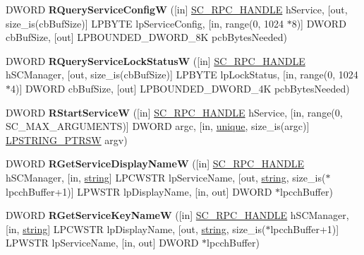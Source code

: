 \begin{DoxyCompactItemize}
\item 
\mbox{\label{interfacesvcctl_ac01214631b67560b652cd09a1f5d3cb5}} 
D\+W\+O\+RD {\bfseries R\+Query\+Service\+ConfigW} (\mbox{[}in\mbox{]} \hyperlink{interfacevoid}{S\+C\+\_\+\+R\+P\+C\+\_\+\+H\+A\+N\+D\+LE} h\+Service, \mbox{[}out, size\+\_\+is(cb\+Buf\+Size)\mbox{]} L\+P\+B\+Y\+TE lp\+Service\+Config, \mbox{[}in, range(0, 1024 $\ast$8)\mbox{]} D\+W\+O\+RD cb\+Buf\+Size, \mbox{[}out\mbox{]} L\+P\+B\+O\+U\+N\+D\+E\+D\+\_\+\+D\+W\+O\+R\+D\+\_\+8K pcb\+Bytes\+Needed)
\item 
\mbox{\label{interfacesvcctl_a1ee08eec718fef7526f3d8846990c295}} 
D\+W\+O\+RD {\bfseries R\+Query\+Service\+Lock\+StatusW} (\mbox{[}in\mbox{]} \hyperlink{interfacevoid}{S\+C\+\_\+\+R\+P\+C\+\_\+\+H\+A\+N\+D\+LE} h\+S\+C\+Manager, \mbox{[}out, size\+\_\+is(cb\+Buf\+Size)\mbox{]} L\+P\+B\+Y\+TE lp\+Lock\+Status, \mbox{[}in, range(0, 1024 $\ast$4)\mbox{]} D\+W\+O\+RD cb\+Buf\+Size, \mbox{[}out\mbox{]} L\+P\+B\+O\+U\+N\+D\+E\+D\+\_\+\+D\+W\+O\+R\+D\+\_\+4K pcb\+Bytes\+Needed)
\item 
\mbox{\label{interfacesvcctl_a5cde7398ff17ce40cc57bca0244530a3}} 
D\+W\+O\+RD {\bfseries R\+Start\+ServiceW} (\mbox{[}in\mbox{]} \hyperlink{interfacevoid}{S\+C\+\_\+\+R\+P\+C\+\_\+\+H\+A\+N\+D\+LE} h\+Service, \mbox{[}in, range(0, S\+C\+\_\+\+M\+A\+X\+\_\+\+A\+R\+G\+U\+M\+E\+N\+TS)\mbox{]} D\+W\+O\+RD argc, \mbox{[}in, \hyperlink{interfaceunique}{unique}, size\+\_\+is(argc)\mbox{]} \hyperlink{struct___s_t_r_i_n_g___p_t_r_s_w}{L\+P\+S\+T\+R\+I\+N\+G\+\_\+\+P\+T\+R\+SW} argv)
\item 
\mbox{\label{interfacesvcctl_ac5f83030fb7fda82a48f2e03f0176ccc}} 
D\+W\+O\+RD {\bfseries R\+Get\+Service\+Display\+NameW} (\mbox{[}in\mbox{]} \hyperlink{interfacevoid}{S\+C\+\_\+\+R\+P\+C\+\_\+\+H\+A\+N\+D\+LE} h\+S\+C\+Manager, \mbox{[}in, \hyperlink{structstring}{string}\mbox{]} L\+P\+C\+W\+S\+TR lp\+Service\+Name, \mbox{[}out, \hyperlink{structstring}{string}, size\+\_\+is($\ast$lpcch\+Buffer+1)\mbox{]} L\+P\+W\+S\+TR lp\+Display\+Name, \mbox{[}in, out\mbox{]} D\+W\+O\+RD $\ast$lpcch\+Buffer)
\item 
\mbox{\label{interfacesvcctl_a838813a025e34c83b100cf19e7498cfa}} 
D\+W\+O\+RD {\bfseries R\+Get\+Service\+Key\+NameW} (\mbox{[}in\mbox{]} \hyperlink{interfacevoid}{S\+C\+\_\+\+R\+P\+C\+\_\+\+H\+A\+N\+D\+LE} h\+S\+C\+Manager, \mbox{[}in, \hyperlink{structstring}{string}\mbox{]} L\+P\+C\+W\+S\+TR lp\+Display\+Name, \mbox{[}out, \hyperlink{structstring}{string}, size\+\_\+is($\ast$lpcch\+Buffer+1)\mbox{]} L\+P\+W\+S\+TR lp\+Service\+Name, \mbox{[}in, out\mbox{]} D\+W\+O\+RD $\ast$lpcch\+Buffer)

\end{DoxyCompactItemize}
